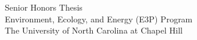 
\begin{titlepage}
\begin{center}
\begingroup
\newcommand{\TitleGap}{\vspace*{\dimexpr 1in-0.25\baselineskip\relax}}
\begin{singlespace}

\MakeUppercase{\docTitle}

\TitleGap
\docAuthorFull

%
%
\TitleGap
\noindent
Senior Honors Thesis \\
Environment, Ecology, and Energy (E3P) Program \\
The University of North Carolina at Chapel Hill \\
\TitleGap
\the\year{} %


\end{singlespace}
\end{center}
\end{titlepage}
